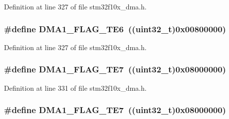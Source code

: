 Definition at line 327 of file stm32f10x\+\_\+dma.\+h.

\subsubsection[{\texorpdfstring{D\+M\+A1\+\_\+\+F\+L\+A\+G\+\_\+\+T\+E6}{DMA1_FLAG_TE6}}]{\setlength{\rightskip}{0pt plus 5cm}\#define D\+M\+A1\+\_\+\+F\+L\+A\+G\+\_\+\+T\+E6~(({\bf uint32\+\_\+t})0x00800000)}\hypertarget{group___d_m_a__flags__definition_ga231e156a0e27f7b2271ea44ca90c237d}{}\label{group___d_m_a__flags__definition_ga231e156a0e27f7b2271ea44ca90c237d}


Definition at line 327 of file stm32f10x\+\_\+dma.\+h.

\subsubsection[{\texorpdfstring{D\+M\+A1\+\_\+\+F\+L\+A\+G\+\_\+\+T\+E7}{DMA1_FLAG_TE7}}]{\setlength{\rightskip}{0pt plus 5cm}\#define D\+M\+A1\+\_\+\+F\+L\+A\+G\+\_\+\+T\+E7~(({\bf uint32\+\_\+t})0x08000000)}\hypertarget{group___d_m_a__flags__definition_ga8b967e41e2d2dcc6d638a664f8e0900c}{}\label{group___d_m_a__flags__definition_ga8b967e41e2d2dcc6d638a664f8e0900c}


Definition at line 331 of file stm32f10x\+\_\+dma.\+h.

\subsubsection[{\texorpdfstring{D\+M\+A1\+\_\+\+F\+L\+A\+G\+\_\+\+T\+E7}{DMA1_FLAG_TE7}}]{\setlength{\rightskip}{0pt plus 5cm}\#define D\+M\+A1\+\_\+\+F\+L\+A\+G\+\_\+\+T\+E7~(({\bf uint32\+\_\+t})0x08000000)}\hypertarget{group___d_m_a__flags__definition_ga8b967e41e2d2dcc6d638a664f8e0900c}{}\label{group___d_m_a__flags__definition_ga8b967e41e2d2dcc6d638a664f8e0900c}


